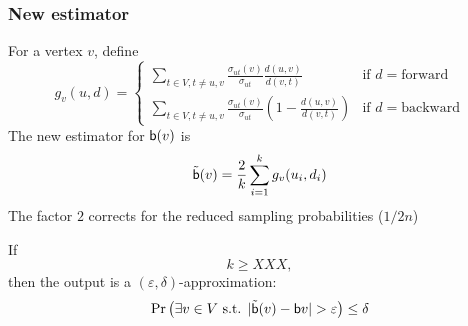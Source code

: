 \begin{frame}
  \frametitle{New estimator}
  For a vertex $v$, define
  \[
    g_v(u,d)=\left\{\begin{array}{ll}
        \sum_{t\in V,t\neq u,v} \frac{\sigma_{ut}(v)}{\sigma_{ut}}\frac{d(u,v)}{d(v,t)}
        & \text{if } d=\text{forward}\\
        \sum_{t\in V,t\neq u,v}
        \frac{\sigma_{ut}(v)}{\sigma_{ut}}\left(1-\frac{d(u,v)}{d(v,t)}\right)
        & \text{if } d=\text{backward}\end{array}\right.
  \]
  \pause
  The new estimator for $\mathsf{b}(v)$ is
  \[
    \tilde{\mathsf{b}}(v)=\frac{2}{k}\sum_{i=1}^k g_v(u_i,d_i)
  \]
  The factor $2$ corrects for the reduced sampling probabilities ($1/2n$)
  \pause
  \begin{theorem}
    If
    \[
      k\ge XXX,
    \]
    then the output is a $(\varepsilon,\delta)$-approximation:
    \[
      \Pr\left(\exists v\in V \text{ s.t. }
      |\tilde{\betw}(v)-\betw{v}|>\varepsilon\right)\le \delta
    \]
    \vspace{-10pt}
  \end{theorem}
\end{frame}

